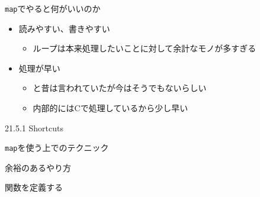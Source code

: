 \documentclass[ignorenonframetext,]{beamer}
\newenvironment{Shaded}{\begin{snugshade}}{\end{snugshade}}
\newcommand{\KeywordTok}[1]{\textcolor[rgb]{0.13,0.29,0.53}{\textbf{#1}}}
\newcommand{\DataTypeTok}[1]{\textcolor[rgb]{0.13,0.29,0.53}{#1}}
\newcommand{\StringTok}[1]{\textcolor[rgb]{0.31,0.60,0.02}{#1}}
\newcommand{\ControlFlowTok}[1]{\textcolor[rgb]{0.13,0.29,0.53}{\textbf{#1}}}
\newcommand{\OperatorTok}[1]{\textcolor[rgb]{0.81,0.36,0.00}{\textbf{#1}}}
\newcommand{\NormalTok}[1]{#1}
\providecommand{\tightlist}{%
  \setlength{\itemsep}{0pt}\setlength{\parskip}{0pt}}
\begin{document}
\begin{frame}{\texttt{map}でやると何がいいのか}

\begin{itemize}
\tightlist
\item
  読みやすい、書きやすい

  \begin{itemize}
  \tightlist
  \item
    ループは本来処理したいことに対して余計なモノが多すぎる
  \end{itemize}
\item
  処理が早い

  \begin{itemize}
  \tightlist
  \item
    と昔は言われていたが今はそうでもないらしい
  \item
    内部的にはCで処理しているから少し早い
  \end{itemize}
\end{itemize}

\end{frame}

\begin{frame}[fragile]{21.5.1 Shortcuts}

\texttt{map}を使う上でのテクニック

\end{frame}

\begin{frame}[fragile]{余裕のあるやり方}

関数を定義する

\begin{Shaded}
\end{Shaded}

\end{frame}
\end{document}
